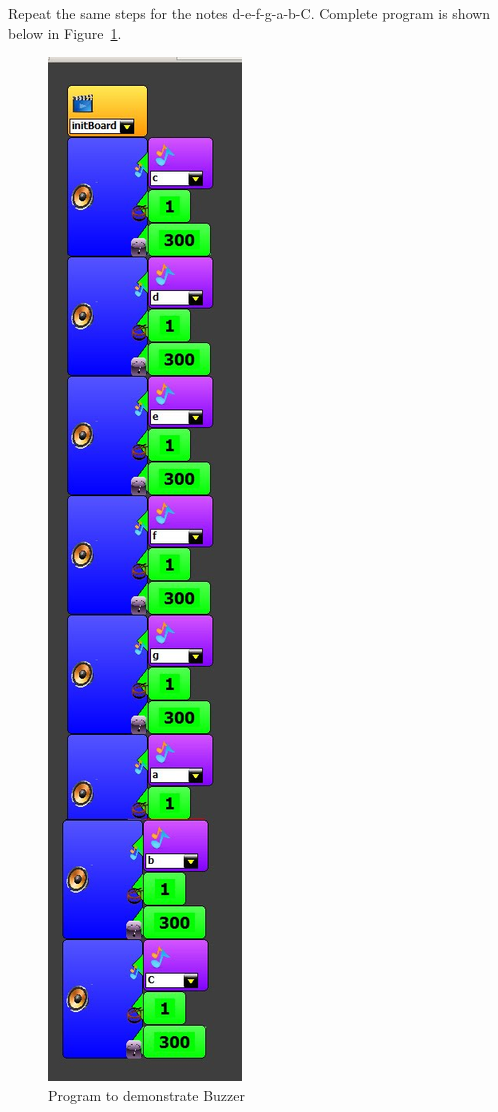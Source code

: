 Repeat the same steps for the notes d-e-f-g-a-b-C. Complete program is shown below in Figure~\ref{fig:lesson_10}. 

\begin{figure}[h]
\centering
\includegraphics[width=0.25\columnwidth]{Images/Manual/lesson_10}
\caption{Program to demonstrate Buzzer}
\label{fig:lesson_10}
\end{figure}

